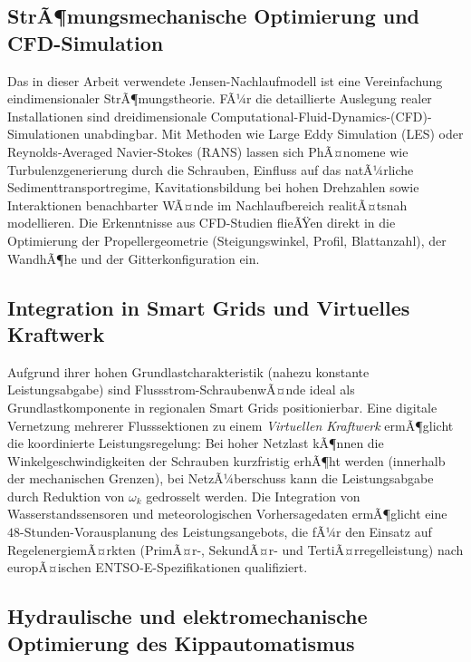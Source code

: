 ﻿\documentclass[a4paper,12pt]{article}
\theoremstyle{definition}
\begin{document}
\subsection{StrÃ¶mungsmechanische Optimierung und CFD-Simulation}

Das in dieser Arbeit verwendete Jensen-Nachlaufmodell ist eine Vereinfachung
eindimensionaler StrÃ¶mungstheorie. FÃ¼r die detaillierte Auslegung realer Installationen
sind dreidimensionale Computational-Fluid-Dynamics-(CFD)-Simulationen unabdingbar.
Mit Methoden wie Large Eddy Simulation (LES) oder Reynolds-Averaged Navier-Stokes
(RANS) lassen sich PhÃ¤nomene wie Turbulenzgenerierung durch die Schrauben, Einfluss
auf das natÃ¼rliche Sedimenttransportregime, Kavitationsbildung bei hohen
Drehzahlen sowie Interaktionen benachbarter WÃ¤nde im Nachlaufbereich realitÃ¤tsnah
modellieren. Die Erkenntnisse aus CFD-Studien flieÃŸen direkt in die Optimierung der
Propellergeometrie (Steigungswinkel, Profil, Blattanzahl), der WandhÃ¶he und der
Gitterkonfiguration ein.

\subsection{Integration in Smart Grids und Virtuelles Kraftwerk}

Aufgrund ihrer hohen Grundlastcharakteristik (nahezu konstante Leistungsabgabe)
sind Flussstrom-SchraubenwÃ¤nde ideal als Grundlastkomponente in regionalen
Smart Grids positionierbar. Eine digitale Vernetzung mehrerer Flusssektionen zu
einem \emph{Virtuellen Kraftwerk} ermÃ¶glicht die koordinierte Leistungsregelung:
Bei hoher Netzlast kÃ¶nnen die Winkelgeschwindigkeiten der Schrauben kurzfristig
erhÃ¶ht werden (innerhalb der mechanischen Grenzen), bei NetzÃ¼berschuss kann die
Leistungsabgabe durch Reduktion von $\omega_k$ gedrosselt werden. Die Integration
von Wasserstandssensoren und meteorologischen Vorhersagedaten ermÃ¶glicht eine
$48$-Stunden-Vorausplanung des Leistungsangebots, die fÃ¼r den Einsatz auf
RegelenergiemÃ¤rkten (PrimÃ¤r-, SekundÃ¤r- und TertiÃ¤rregelleistung) nach europÃ¤ischen
ENTSO-E-Spezifikationen qualifiziert.

\subsection{Hydraulische und elektromechanische Optimierung des Kippautomatismus}
\end{document}
